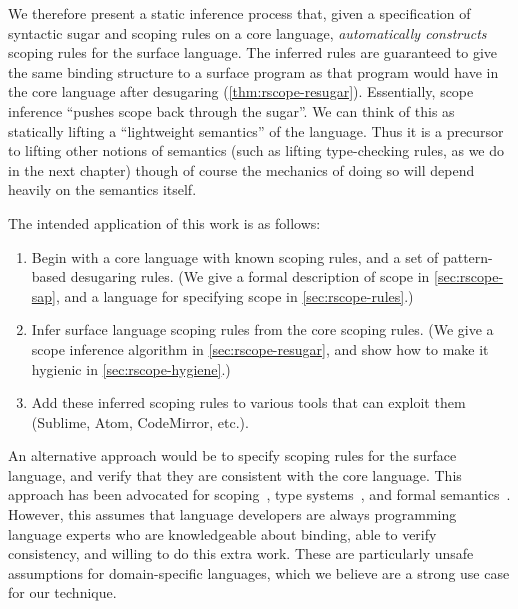 We therefore present a static inference process that, given a
specification of syntactic sugar and scoping rules on a core language,
\emph{automatically constructs} scoping rules for the surface
language. The inferred rules are guaranteed to give the same binding
structure to a surface program as that program would have in the core language
after desugaring (\cref{thm:rscope-resugar}).
Essentially, scope inference ``pushes scope back through the sugar''. We
can think of this as statically lifting a ``lightweight semantics'' of
the language. Thus it is a precursor to lifting other notions of semantics
(such as lifting type-checking rules, as we do in the next chapter)
though of course the mechanics of doing so will depend heavily on the
semantics itself.

The intended application of this work is as follows:
\begin{enumerate}
\item Begin with a core language with known scoping rules, and a set
  of pattern-based desugaring rules. (We give a formal description of
  scope in \cref{sec:rscope-sap}, and a language for specifying scope in
  \cref{sec:rscope-rules}.)
\item Infer surface language scoping rules from the core scoping
  rules. (We give a scope inference algorithm in
  \cref{sec:rscope-resugar}, and show how to make it hygienic in
  \cref{sec:rscope-hygiene}.)
\item Add these inferred scoping rules to various tools that can exploit
  them (Sublime, Atom, CodeMirror, etc.).
\end{enumerate}

An alternative approach would be to specify scoping rules for the
surface language, and verify that they are consistent with the core
language. This approach has been advocated for
scoping~\cite{herman-hygiene,stansifer-romeo},
type systems~\cite{typechecking-exts},
and formal semantics~\cite{ziggurat}.
However, this assumes that language developers are always programming
language experts who are knowledgeable about binding, able to verify consistency, and willing
to do this extra work. These are particularly unsafe assumptions for
domain-specific languages, which we believe are a strong use case for
our technique.

